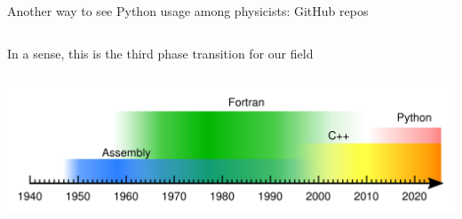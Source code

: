\documentclass[aspectratio=169]{beamer}
\begin{document}
\begin{frame}{Another way to see Python usage among physicists: GitHub repos}
\begin{columns}
\end{columns}
\end{frame}

\begin{frame}{In a sense, this is the third phase transition for our field}
\vspace{0.5 cm}
\begin{columns}
\includegraphics[width=\linewidth]{programming-languages.pdf}
\end{columns}
\end{frame}
\end{document}
